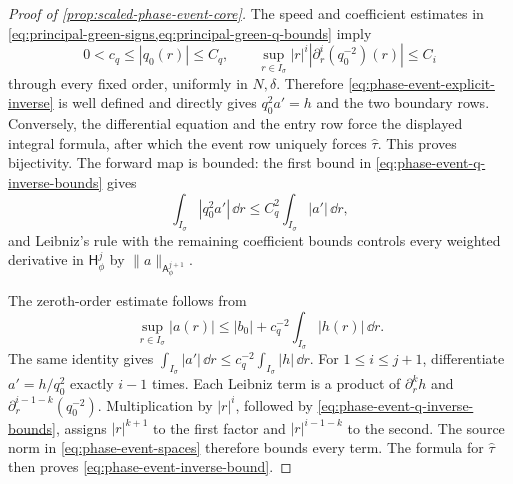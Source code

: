 \begin{proof}[Proof of \cref{prop:scaled-phase-event-core}]
The speed and coefficient estimates in
\cref{eq:principal-green-signs,eq:principal-green-q-bounds} imply
\begin{equation}
 0<c_q\le|q_0(r)|\le C_q,\qquad
 \sup_{r\in I_\sigma}|r|^i
       |\partial_r^i(q_0^{-2})(r)|\le C_i          \label{eq:phase-event-q-inverse-bounds}
\end{equation}
through every fixed order, uniformly in \(N,\delta\).  Therefore
\cref{eq:phase-event-explicit-inverse} is well defined and directly gives
\(q_0^2a'=h\) and the two boundary rows.  Conversely, the differential
equation and the entry row force the displayed integral formula, after which
the event row uniquely forces \(\widehat\tau\).  This proves bijectivity.
The forward map is bounded: the first bound in
\cref{eq:phase-event-q-inverse-bounds} gives
\[
 \int_{I_\sigma}|q_0^2a'|\,\dd r
 \le C_q^2\int_{I_\sigma}|a'|\,\dd r,
\]
and Leibniz's rule with the remaining coefficient bounds controls every
weighted derivative in \(\mathsf H_\phi^j\) by
\(\|a\|_{\mathsf A_\phi^{j+1}}\).

The zeroth-order estimate follows from
\begin{equation*}
\sup_{r\in I_\sigma}|a(r)|
 \le |b_0|+c_q^{-2}\int_{I_\sigma}|h(r)|\,\dd r.
\end{equation*}
The same identity gives
\(\int_{I_\sigma}|a'|\,\dd r
 \le c_q^{-2}\int_{I_\sigma}|h|\,\dd r\).
For \(1\le i\le j+1\), differentiate
\(a'=h/q_0^2\) exactly \(i-1\) times.  Each Leibniz term is a product of
\(\partial_r^kh\) and
\(\partial_r^{i-1-k}(q_0^{-2})\).  Multiplication by \(|r|^i\), followed by
\cref{eq:phase-event-q-inverse-bounds}, assigns \(|r|^{k+1}\) to the first
factor and \(|r|^{i-1-k}\) to the second.  The source norm in
\cref{eq:phase-event-spaces} therefore bounds every term.  The formula for
\(\widehat\tau\) then proves \cref{eq:phase-event-inverse-bound}.


\end{proof}
